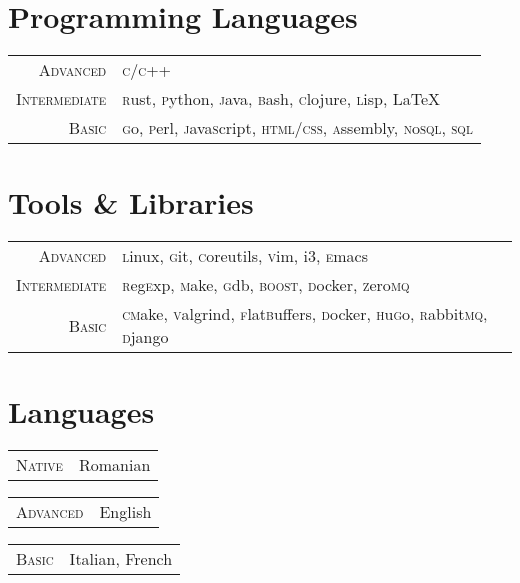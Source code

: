 \documentclass[a4paper,12pt]{article}
\begin{document}
\section{Programming Languages}
\begin{tabular}{rl}
  \textsc{Advanced}&
    \textsc{c/c++}\\
  \textsc{Intermediate}&
    \textsc{r}ust, \textsc{p}ython, \textsc{j}ava, 
    \textsc{b}ash, \textsc{c}lojure, \textsc{l}isp, 
    \LaTeX\\
  \textsc{Basic}&
    \textsc{g}o, \textsc{p}erl, \textsc{j}ava\textsc{s}cript, 
    \textsc{html/css}, \textsc{a}ssembly, 
    \textsc{n}o\textsc{sql}, \textsc{sql}\\
\end{tabular}

\section{Tools \& Libraries}
\begin{tabular}{rl}
  \textsc{Advanced}&
    \textsc{l}inux, \textsc{g}it, \textsc{c}oreutils, \textsc{v}im,  i3, \textsc{e}macs\\
  \textsc{Intermediate}&
     \textsc{r}eg\textsc{e}xp, \textsc{m}ake, \textsc{g}db, \textsc{boost}, \textsc{d}ocker, \textsc{z}ero\textsc{mq}\\ 
  \textsc{Basic}&
    \textsc{cm}ake,  \textsc{v}algrind, \textsc{f}lat\textsc{b}uffers, 
    \textsc{d}ocker, \textsc{h}u\textsc{g}o, 
    \textsc{r}abbit\textsc{mq}, \textsc{d}jango \\ 
\end{tabular}

\section{Languages}
\begin{multicols}{3}
  \begin{tabular}{rl}
    \textsc{Native}&Romanian\\
  \end{tabular}
  \columnbreak

  \begin{tabular}{rl}
    \textsc{Advanced}&English\\
  \end{tabular}
  \columnbreak

  \begin{tabular}{rl}
    \textsc{Basic}&Italian, French\\
  \end{tabular}
\end{multicols}
\end{document}
